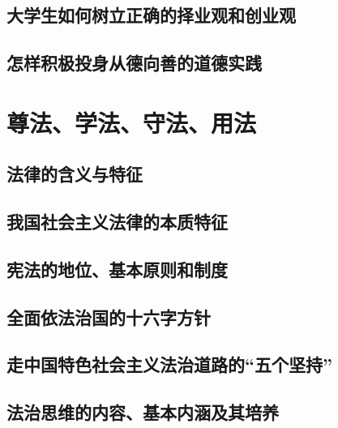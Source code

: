 \subsection{大学生如何树立正确的择业观和创业观}
\subsection{怎样积极投身从德向善的道德实践}

\section{尊法、学法、守法、用法}
\subsection{法律的含义与特征}
\subsection{我国社会主义法律的本质特征}
\subsection{宪法的地位、基本原则和制度}
\subsection{全面依法治国的十六字方针}
\subsection{走中国特色社会主义法治道路的“五个坚持”}
\subsection{法治思维的内容、基本内涵及其培养}
